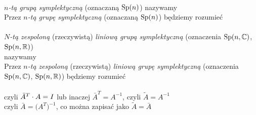 \documentclass[a4paper,11pt]{article}
\begin{document}
 \\
\Jest  \textit{$n$-tą grupą symplektyczną} (oznaczaną $\mathrm{Sp}( n )$)
nazywamy \\
\Powin Przez \textit{$n$-tą grupę symplektyczną} (oznaczaną $\mathrm{Sp}( n )$)
będziemy rozumieć \\
 \\
\Jest  \textit{$N$-tą zespoloną} (rzeczywistą) \textit{liniową grupą
  symplektyczną} (oznaczenia $\mathrm{Sp}( n, \mathbb{C} )$, $\mathrm{Sp}( n, \mathbb{R} )$) \\
nazywamy \\
\Powin Przez \textit{$n$-tą zespoloną} (rzeczywistą) \textit{liniową grupę
  symplektyczną} (oznaczenia $\mathrm{Sp}( n, \mathbb{C} )$, $\mathrm{Sp}( n, \mathbb{R} )$) będziemy
rozumieć \\
 \\
\Jest  czyli $\bar{A}^{ T } \cdot A = I$ lub inaczej
$\bar{A}^{ T } = A^{ -1 }$, czyli $\widetilde{A} = A^{ -1 }$ \\[0.5em]
\Powin czyli $\bar{A} = \Big( A^{ T } \Big)^{ -1 }$, co można zapisać jako
$\widetilde{A} = \bar{A}$ \\














{}






\end{document}
